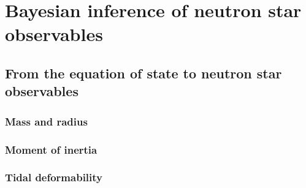 %

\chapter{Bayesian inference of neutron star observables} %

\section{From the equation of state to neutron star observables} %


\subsection{Mass and radius} %


\subsection{Moment of inertia} %


\subsection{Tidal deformability} %


